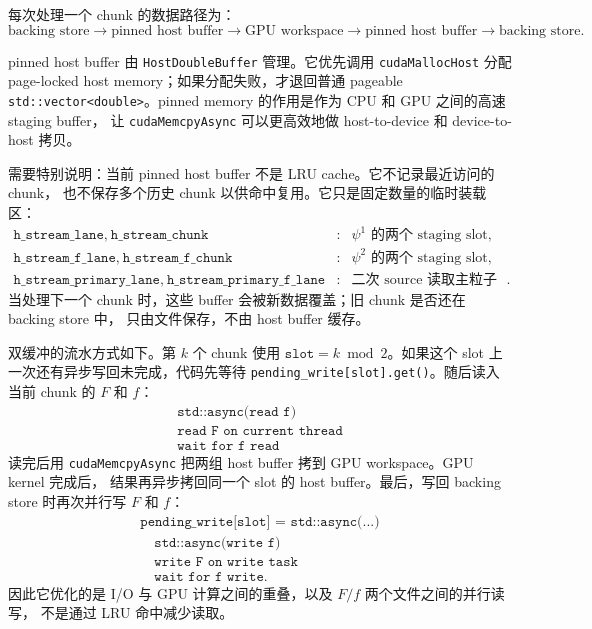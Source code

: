 \documentclass[11pt,a4paper]{ctexart}
\begin{document}
每次处理一个 chunk 的数据路径为：
\begin{equation}
  \text{backing store}
  \rightarrow
  \text{pinned host buffer}
  \rightarrow
  \text{GPU workspace}
  \rightarrow
  \text{pinned host buffer}
  \rightarrow
  \text{backing store}.
\end{equation}

pinned host buffer 由 \texttt{HostDoubleBuffer} 管理。它优先调用
\texttt{cudaMallocHost} 分配 page-locked host memory；如果分配失败，才退回普通 pageable
\texttt{std::vector<double>}。pinned memory 的作用是作为 CPU 和 GPU 之间的高速 staging buffer，
让 \texttt{cudaMemcpyAsync} 可以更高效地做 host-to-device 和 device-to-host 拷贝。

需要特别说明：当前 pinned host buffer 不是 LRU cache。它不记录最近访问的 chunk，
也不保存多个历史 chunk 以供命中复用。它只是固定数量的临时装载区：
\begin{equation}
\begin{array}{lll}
\texttt{h\_stream\_lane},\ \texttt{h\_stream\_chunk}
&:& \psi^1\text{ 的两个 staging slot},\\
\texttt{h\_stream\_f\_lane},\ \texttt{h\_stream\_f\_chunk}
&:& \psi^2\text{ 的两个 staging slot},\\
\texttt{h\_stream\_primary\_lane},\ \texttt{h\_stream\_primary\_f\_lane}
&:& \text{二次 source 读取主粒子时的 staging buffer}.
\end{array}
\end{equation}
当处理下一个 chunk 时，这些 buffer 会被新数据覆盖；旧 chunk 是否还在 backing store 中，
只由文件保存，不由 host buffer 缓存。

双缓冲的流水方式如下。第 \(k\) 个 chunk 使用
\(\texttt{slot}=k\bmod2\)。如果这个 slot 上一次还有异步写回未完成，代码先等待
\texttt{pending\_write[slot].get()}。随后读入当前 chunk 的 \(F\) 和 \(f\)：
\begin{equation}
\begin{array}{c}
\texttt{std::async(read f)}\\
\texttt{read F on current thread}\\
\texttt{wait for f read}
\end{array}
\end{equation}
读完后用 \texttt{cudaMemcpyAsync} 把两组 host buffer 拷到 GPU workspace。GPU kernel 完成后，
结果再异步拷回同一个 slot 的 host buffer。最后，写回 backing store 时再次并行写 \(F\) 和 \(f\)：
\begin{equation}
\begin{array}{c}
\texttt{pending\_write[slot] = std::async(...)}\\
\quad \texttt{std::async(write f)}\\
\quad \texttt{write F on write task}\\
\quad \texttt{wait for f write}.
\end{array}
\end{equation}
因此它优化的是 I/O 与 GPU 计算之间的重叠，以及 \(F/f\) 两个文件之间的并行读写，
不是通过 LRU 命中减少读取。
\end{document}
